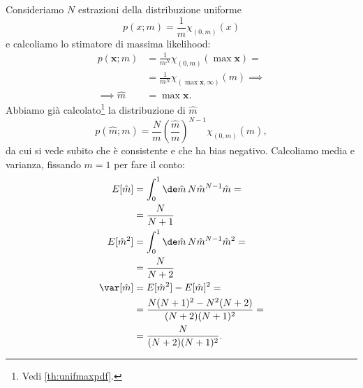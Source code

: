 \begin{example}
	Consideriamo $N$ estrazioni della distribuzione uniforme
	\begin{equation*}
		p(x;m) = \frac 1m \chi_{(0,m)}(x)
	\end{equation*}
	e calcoliamo lo stimatore di massima likelihood:
	\begin{align*}
		p(\mathbf x;m)
		&= \frac1{m^N} \chi_{(0,m)}(\max\mathbf x) = \\
		&= \frac1{m^N} \chi_{(\max\mathbf x,\infty)}(m) \implies \\
		\implies \hat m&=\max\mathbf x.
	\end{align*}
	Abbiamo già calcolato\footnote{Vedi \autoref{th:unifmaxpdf}.} la distribuzione di $\hat m$
	\begin{equation*}
		p(\hat m;m)
		= \frac Nm \left(\frac{\hat m}m\right)^{N-1} \chi_{(0,m)}(\hat m),
	\end{equation*}
	da cui si vede subito che è consistente
	e che ha bias negativo.
	Calcoliamo media e varianza, fissando $m=1$ per fare il conto:
	\begin{align*}
		E[\hat m]
		&= \int_0^1 \de\hat m\, N \hat m^{N-1} \hat m = \\
		&= \frac N{N+1} \\
		E[\hat m^2]
		&= \int_0^1 \de\hat m\, N \hat m^{N-1} \hat m^2 = \\
		&= \frac N{N+2} \\
		\var[\hat m]
		&= E[\hat m^2] - E[\hat m]^2 = \\
		&= \frac{N(N+1)^2 - N^2(N+2)}{(N+2)(N+1)^2} = \\
		&= \frac N{(N+2)(N+1)^2}.
	\end{align*}
\end{example}
